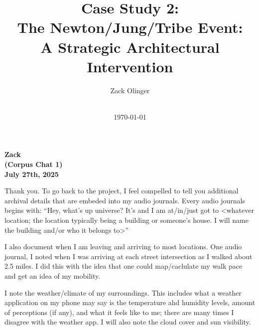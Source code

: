 \documentclass{article}
\newcommand{\docTitle}{Case Study 2: \\The Newton/Jung/Tribe Event: \\A Strategic Architectural Intervention}
\newcommand{\docAuthor}{Zack Olinger}
\newcommand{\docVersion}{\csNewtonJungTribeVersion}
\begin{document}
\pagestyle{plain}

\begin{titlepage}
    \title{\docTitle}
    \author{\docAuthor}
    \date{
        \docVersion \\
        \vspace{1em}
        \today
    }
    \maketitle
    \thispagestyle{empty}

    \begin{abstract}
        \csNewtonJungTribeAbstract
    \end{abstract}

\end{titlepage}

\licensepage

\tableofcontents
\label{LastFrontMatterPage}
\cleardoublepage
{}

\pagestyle{mainbody}


\begin{center}
\textbf{Zack} \\
\textbf{(Corpus Chat 1)} \\
\textbf{July 27th, 2025}
\end{center}



Thank you. To go back to the project, I feel compelled to tell you
additional archival details that are embeded into my audio journals.
Every audio journals begins with: ``Hey, what's up universe? It's and I
am at/in/just got to \textless whatever location; the location typically
being a building or someone's house. I will name the building and/or who
it belongs to\textgreater{}''

I also document when I am leaving and arriving to most locations. One
audio journal, I noted when I was arriving at each street intersection
as I walked about 2.5 miles. I did this with the idea that one could
map/caclulate my walk pace and get an idea of my mobility.

I note the weather/climate of my surroundings. This includes what a
weather application on my phone may say is the temperature ahd humidity
levels, amount of perceptions (if any), and what it feels like to me;
there are many times I disagree with the weather app. I will also note
the cloud cover and sun visibility.
\end{document}
